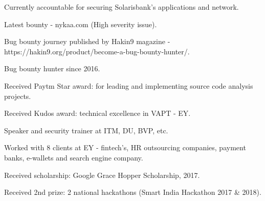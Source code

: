 
\cvsubsection{}

  \begin{cvitems} %
    \item {Currently accountable for securing Solarisbank's applications and network.}
    \item {Latest bounty - nykaa.com (High severity issue).}
    \item {Bug bounty journey published by Hakin9 magazine - https://hakin9.org/product/become-a-bug-bounty-hunter/.}
    \item {Bug bounty hunter since 2016.}
    \item {Received Paytm Star award: for leading and implementing source code analysis projects.}
    \item {Received Kudos award: technical excellence in VAPT - EY.}
    \item {Speaker and security trainer at ITM, DU, BVP, etc.}
    \item {Worked with 8 clients at EY - fintech’s, HR outsourcing companies, payment banks, e-wallets and search engine company.}
    \item {Received scholarship: Google Grace Hopper Scholarship, 2017.}
    \item {Received 2nd prize: 2 national hackathons (Smart India Hackathon 2017 \& 2018).}

  \end{cvitems}
